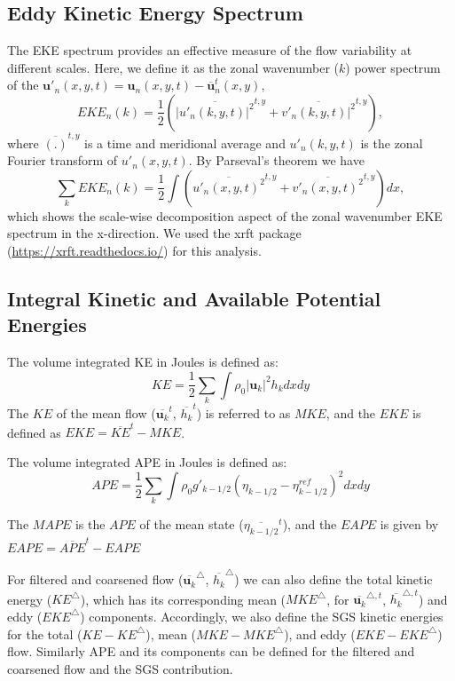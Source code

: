 \documentclass[draft]{agujournal2019}
\begin{document}
\subsection{Eddy Kinetic Energy Spectrum}
The EKE spectrum provides an effective measure of the flow variability at different scales. 
Here, we define it as the zonal wavenumber ($k$) power spectrum of the $\mathbf{u}'_n(x,y,t) = \mathbf{u}_n(x,y,t) - \overline{\mathbf{u}}^t_n(x,y)$, 
\begin{equation}
    EKE_n(k) = \frac{1}{2}(\overline{|u'_n(k, y,t)|^2}^{t,y} + \overline{v'_n(k, y,t)|^2}^{t,y}),
\end{equation}
where $\overline{(.)}^{t,y}$ is a time and meridional average and $u'_n(k, y,t)$ is the zonal Fourier transform of $u'_n(x, y,t)$. By Parseval's theorem we have
\begin{equation}
    \sum_k EKE_n(k) = \frac{1}{2} \int ( \overline{u'_n(x, y,t)^2}^{t,y} + \overline{v'_n(x, y,t)^2}^{t,y}) dx,
\end{equation} 
which shows the scale-wise decomposition aspect of the zonal wavenumber EKE spectrum in the x-direction. We used the xrft package (\url{https://xrft.readthedocs.io/}) for this analysis.


\subsection{Integral Kinetic and Available Potential Energies}
The volume integrated KE in Joules is defined as: 
\begin{equation}
    KE = \frac{1}{2} \sum_k \int \rho_0 |\mathbf{u}_k|^2 h_k dx dy
\end{equation}
The $KE$ of the mean flow ($\overline{\mathbf{u}_k}^t$, $\overline{h_k}^t$) is referred to as $MKE$, and the $EKE$ is defined as $EKE = \overline{KE}^t - MKE$. 

The volume integrated APE in Joules is defined as: 
\begin{equation}
    APE = \frac{1}{2} \sum_k \int \rho_0   g'_{k-1/2} (\eta_{k-1/2} - \eta^{ref}_{k-1/2})^2 dxdy
\end{equation}

The $MAPE$ is the $APE$ of the mean state ($\overline{\eta_{k-1/2}}^t$), and the $EAPE$ is given by $EAPE = \overline{APE}^t - EAPE$

For filtered and coarsened flow ($\overline{\mathbf{u}_k}^{\triangle}$, $\overline{h_k}^{\triangle}$) we can also define the total kinetic energy ($KE^\triangle$), which has its corresponding mean ($MKE^\triangle$, for $\overline{\mathbf{u}_k}^{\triangle, t}$, $\overline{h_k}^{\triangle,t}$) and eddy ($EKE^\triangle$) components. Accordingly, we also define the SGS kinetic energies for the total ($KE- KE^\triangle$), mean ($MKE- MKE^\triangle$), and eddy ($EKE- EKE^\triangle$) flow. Similarly APE and its components can be defined for the filtered and coarsened flow and the SGS contribution.
\end{document}
